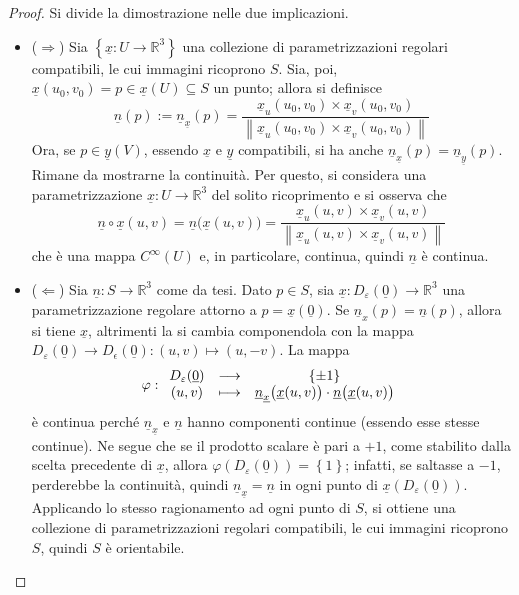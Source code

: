 \documentclass[12pt]{scrartcl}
\theoremstyle{style}
\numberwithin{equation}{subsection}
\begin{document}
\begin{proof}
	Si divide la dimostrazione nelle due implicazioni.
	\begin{itemize}
		\item ($\Rightarrow $) Sia $\left\{ \underline{x}:U \to \mathbb{R}^3 \right\} $ una collezione di parametrizzazioni regolari compatibili, le cui immagini ricoprono $S$.
			Sia, poi, $\underline{x}(u_0,v_0) = p \in \underline{x}(U) \subseteq S$ un punto; allora si definisce 
			\[
			\underline{n}(p):= \underline{n}_{\underline{x}} (p) = \frac{\underline{x}_u (u_0,v_0) \times \underline{x}_v (u_0,v_0)}{\left\lVert \underline{x}_u (u_0,v_0) \times \underline{x}_v (u_0,v_0) \right\rVert }
			\] 
			Ora, se $p \in \underline{y}(V)$, essendo $\underline{x}$ e $\underline{y}$ compatibili, si ha anche $\underline{n}_{\underline{x}} (p)= \underline{n}_{\underline{y}}(p )$.
			Rimane da mostrarne la continuit\`a.
			Per questo, si considera una parametrizzazione $\underline{x}:U\to \mathbb{R}^3$ del solito ricoprimento e si osserva che
			\[
			\underline{n}\circ \underline{x}(u,v) = \underline{n}\big(\underline{x}(u,v)\big)=\frac{\underline{x}_u (u,v) \times \underline{x}_v (u,v)}{\left\lVert \underline{x}_u (u,v) \times \underline{x}_v (u,v) \right\rVert }
			\] 
		che \`e una mappa $C^\infty(U)$	e, in particolare, continua, quindi $\underline{n}$ \`e continua.
	\item ($\Leftarrow$) Sia $\underline{n}:S\to\mathbb{R}^3$ come da tesi.
		Dato $p \in S$, sia $\underline{x}:D_\varepsilon (\underline{0}) \to \mathbb{R}^3$ una parametrizzazione regolare attorno a $p=\underline{x}(\underline{0})$.
		Se $\underline{n}_x(p) = \underline{n}(p)$, allora si tiene $\underline{x}$, altrimenti la si cambia componendola con la mappa $D_\varepsilon (\underline{0}) \to D_\epsilon (\underline{0}):(u,v)\longmapsto (u,-v)$.
		La mappa 
		\[
		\varphi :
		\begin{array}
			{c c c}
			D_\varepsilon (\underline{0})&\longrightarrow& \left\{ \pm 1 \right\} \\
			(u,v) &\longmapsto & \underline{n}_{\underline{x}} \big(\underline{x}(u,v)\big)\cdot  \underline{n} \big(\underline{x}(u,v)\big)
		\end{array}
		\] 
		\`e continua perch\'e $\underline{n}_{\underline{x}} $ e $\underline{n}$ hanno componenti continue (essendo esse stesse continue).
		Ne segue che se il prodotto scalare \`e pari a $+1$, come stabilito dalla scelta precedente di $\underline{x}$, allora $\varphi (D_\varepsilon (\underline{0})) = \left\{ 1 \right\} $; infatti, se saltasse a $-1$, perderebbe la continuit\`a, quindi $\underline{n}_{\underline{x}} = \underline{n}$ in ogni punto di $\underline{x}(D_\varepsilon (\underline{0}))$.
		Applicando lo stesso ragionamento ad ogni punto di $S$, si ottiene una collezione di parametrizzazioni regolari compatibili, le cui immagini ricoprono $S$, quindi $S$ \`e orientabile.
	\end{itemize}
\end{proof}
\end{document}

